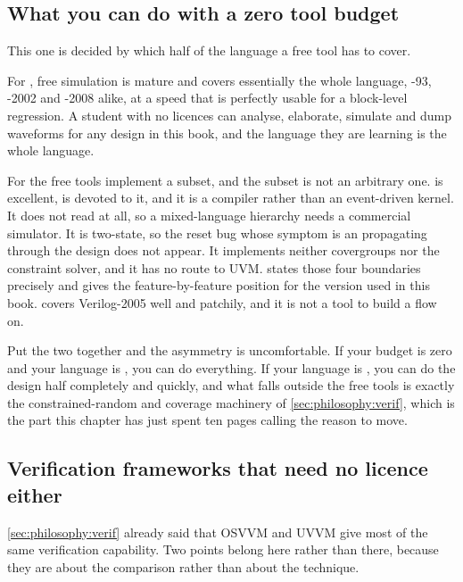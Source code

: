 \subsection{What you can do with a zero tool budget}

This one is decided by which half of the language a free tool has to cover.

For \VHDL{}, free simulation is mature and covers essentially the whole
language, \VHDL{}-93, -2002 and -2008 alike, at a speed that is perfectly
usable for a block-level regression. A student with no licences can analyse,
elaborate, simulate and dump waveforms for any \VHDL{} design in this book,
and the language they are learning is the whole language.

For \SV{} the free tools implement a subset, and the subset is not an
arbitrary one.  is excellent,  is devoted
to it, and it is a compiler rather than an event-driven kernel. It does not
read \VHDL{} at all, so a mixed-language hierarchy needs a commercial
simulator. It is two-state, so the reset bug whose symptom is an 
propagating through the design does not appear. It implements neither
covergroups nor the constraint solver, and it has no route to UVM.
 states those four boundaries precisely and gives the feature-by-feature position for the
version used in this book.  covers Verilog-2005 well and
\SV{} patchily, and it is not a tool to build a flow on.

Put the two together and the asymmetry is uncomfortable. If your budget is
zero and your language is \VHDL{}, you can do everything. If your language is
\SV{}, you can do the design half completely and quickly, and what falls
outside the free tools is exactly the constrained-random and coverage
machinery of \cref{sec:philosophy:verif}, which is the part this chapter has
just spent ten pages calling the reason to move.

\subsection{Verification frameworks that need no licence either}

\cref{sec:philosophy:verif} already said that OSVVM and UVVM give \VHDL{} most
of the same verification capability. Two points belong here rather than there,
because they are about the comparison rather than about the technique.

